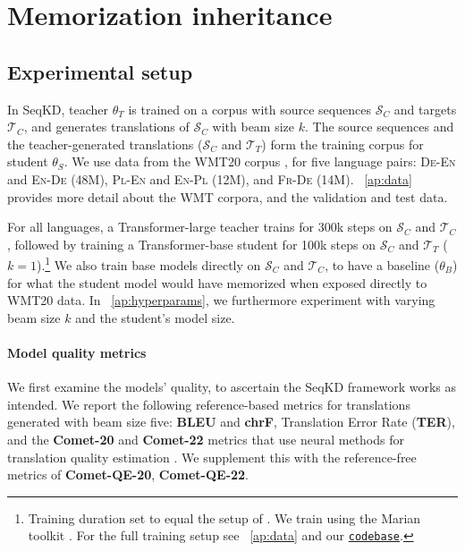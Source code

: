 \section{Memorization inheritance}
\label{sec:memorization_inheritance}

\subsection{Experimental setup}
\label{sec:experimental_setup}
In SeqKD, teacher $\theta_T$ is trained on a corpus with source sequences $\mathcal{S}_C$ and targets $\mathcal{T}_C$, and generates translations of $\mathcal{S}_C$ with beam size $k$. The source sequences and the teacher-generated translations ($\mathcal{S}_C$ and $\mathcal{T}_T$) form the training corpus for student $\theta_S$.
We use data from the WMT20 corpus \citep{barrault-etal-2020-findings}, for five language pairs: \textsc{De}-\textsc{En} and \textsc{En}-\textsc{De} (48M), \textsc{Pl}-\textsc{En} and \textsc{En}-\textsc{Pl} (12M), and \textsc{Fr}-\textsc{De} (14M). \appendixshortcut~\ref{ap:data} provides more detail about the WMT corpora, and the validation and test data.

For all languages, a Transformer-large teacher trains for 300k steps on $\mathcal{S}_C$ and $\mathcal{T}_C$, followed by training a Transformer-base student for 100k steps on $\mathcal{S}_C$ and $\mathcal{T}_T$ ($k{=}1$).\footnote{Training duration set to equal the setup of \citet{vaswani2017attention}. We train using the Marian toolkit \citep{junczys2018marian}. For the full training setup see \appendixshortcut~\ref{ap:data} and our \href{https://github.com/vyraun/memseqkd}{\texttt{codebase}}.} 
We also train base models directly on $\mathcal{S}_C$ and $\mathcal{T}_C$, to have a baseline ($\theta_{B}$) for what the student model would have memorized when exposed directly to WMT20 data.
In \appendixshortcut~\ref{ap:hyperparams}, we furthermore experiment with varying beam size $k$ and the student's model size.

\paragraph{Model quality metrics}
We first examine the models' quality, to ascertain the SeqKD framework works as intended. 
We report the following reference-based metrics for translations generated with beam size five: \textbf{BLEU} and \textbf{chrF}, %
Translation Error Rate (\textbf{TER}), 
and the \textbf{Comet-20} and \textbf{Comet-22} metrics that use neural methods for translation quality estimation \citep{rei2020comet, rei2022comet}.
We supplement this with the reference-free metrics of \textbf{Comet-QE-20}, \textbf{Comet-QE-22}.

